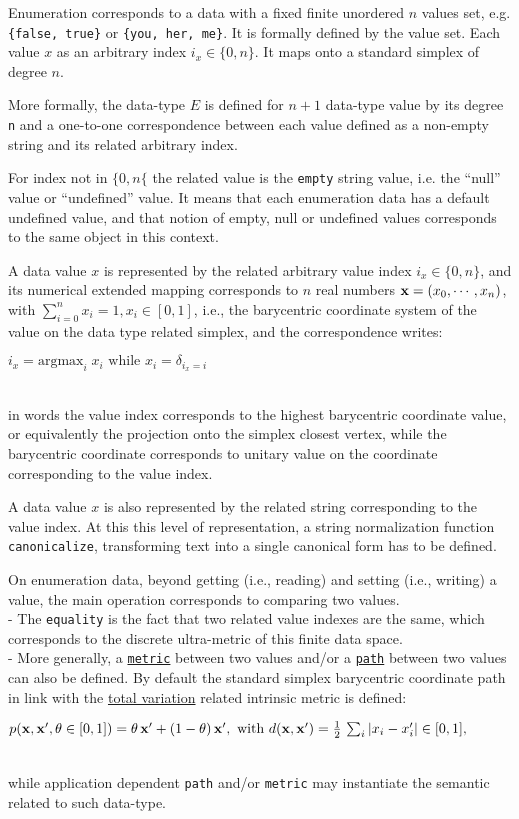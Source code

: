 \documentclass[a4,12pt]{article}
\newcommand{\eqline}[1]{\\\centerline{$#1$}\\}
\begin{document}
Enumeration corresponds to a data with a fixed finite unordered $n$ values set, e.g. {\tt \{false, true\}} or {\tt \{you, her, me\}}. It is formally defined by the value set. Each value $x$ as an arbitrary index $i_x \in \{0, n\}$. It maps onto a standard simplex of degree $n$. 

More formally, the data-type $E$ is defined for $n+1$ data-type value by its degree {\tt n} and a one-to-one correspondence between each value defined as a non-empty string and its related arbitrary index. 

For index not in $\{0, n\{$ the related value is the {\tt empty} string value, i.e. the ``null'' value or ``undefined'' value. It means that each enumeration data has a default undefined value, and that notion of empty, null or undefined values corresponds to the same object in this context.

A data value $x$ is represented by the related arbitrary value index $i_x \in \{0, n\}$, and its numerical extended mapping corresponds to $n$ real numbers ${\bf x} = (x_0, \cdots, x_{n})$, with $\sum_{i = 0}^{n} x_i = 1, x_i \in [0, 1]$, i.e., the barycentric coordinate system of the value on the data type related simplex, and the correspondence writes:
\eqline{i_x = \mbox{argmax}_i \; x_i \mbox{ while } x_i = \delta_{i_x = i}}
in words the value index corresponds to the highest barycentric coordinate value, or equivalently the projection onto the simplex closest vertex, while the barycentric coordinate corresponds to unitary value on the coordinate corresponding to the value index.

A data value $x$ is also represented by the related string corresponding to the value index. At this this level of representation, a string normalization function {\tt canonicalize}, transforming text into a single canonical form has to be defined.

On enumeration data, beyond getting (i.e., reading) and setting (i.e., writing) a value, the main operation corresponds to comparing two values.
\\- The {\tt equality} is the fact that two related value indexes are the same, which corresponds to the discrete ultra-metric of this finite data space.
\\- More generally, a \href{https://en.wikipedia.org/wiki/Metric\_(mathematics)}{\tt metric} between two values and/or a \href{https://en.wikipedia.org/wiki/Intrinsic_metric}{\tt path} between two values can also be defined. By default the standard simplex barycentric coordinate path in link with the \href{https://en.wikipedia.org/wiki/Total_variation_distance_of_probability_measures}{total variation} related intrinsic metric is defined:
\eqline{p({\bf x}, {\bf x}', \theta \in [0, 1]) = \theta \, {\bf x}' + (1 - \theta) \, {\bf x}', \mbox{ with } d({\bf x}, {\bf x}') = \frac{1}{2} \, \sum_i |x_i - x'_i| \in [0, 1],}
while application dependent {\tt path} and/or {\tt metric} may instantiate the semantic related to such data-type.
\end{document}
